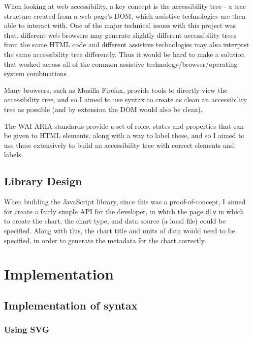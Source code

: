 \documentclass[ %
                    author={Aleena Baig},
                supervisor={Dr Simon Lock},
                    degree={BSc},
                     title={On Making Web Accessible Graphs},
                  subtitle={},
                      year={2019} ]{dissertation}
\begin{document}
When looking at web accessibility, a key concept is the accessibility tree - a tree structure created from a web page's DOM, which assistive technologies are then able to interact with. One of the major technical issues with this project was that, different web browsers may generate slightly different accessibility trees from the same HTML code and different assistive technologies may also interpret the same accessibility tree differently. Thus it would be hard to make a solution that worked across all of the common assistive technology/browser/operating system combinations.


Many browsers, such as Mozilla Firefox, provide tools to directly view the accessibility tree, and so I aimed to use syntax to create as clean an accessibility tree as possible (and by extension the DOM would also be clean).

The WAI-ARIA standards provide a set of roles, states and properties that can be given to HTML elements, along with a way to label these, and so I aimed to use these extensively to build an accessibility tree with correct elements and labels

\section{Library Design}

When building the JavaScript library, since this was a proof-of-concept, I aimed for create a fairly simple API for the developer, in which the page \texttt{div} in which to create the chart, the chart type, and data source (a local file) could be specified. Along with this, the chart title and units of data would need to be specified, in order to generate the metadata for the chart correctly.

\chapter{Implementation}

\section{Implementation of syntax}

\subsection{Using SVG}
\end{document}
